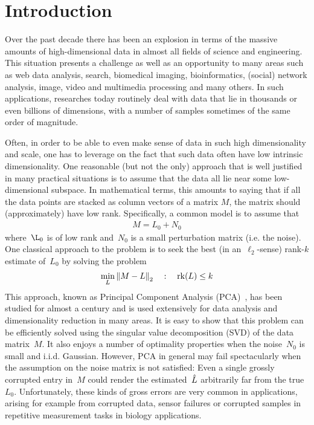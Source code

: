 \section*{Introduction}

Over the past decade there has been an explosion in terms of the massive amounts of high-dimensional data in almost all fields of science and engineering. This situation presents a challenge as well as an opportunity to many areas such as web data analysis, search, biomedical imaging, bioinformatics, (social) network analysis, image, video and multimedia processing and many others. In such applications, researches today routinely deal with data that lie in thousands or even billions of dimensions, with a number of samples sometimes of the same order of magnitude.

Often, in order to be able to even make sense of data in such high dimensionality and scale, one has to leverage on the fact that such data often have low intrinsic dimensionality. One reasonable (but not the only) approach that is well justified in many practical situations is to assume that the data all lie near some low-dimensional subspace. In mathematical terms, this amounts to saying that if all the data points are stacked as column vectors of a matrix $M$, the matrix should (approximately) have low rank. Specifically, a common model is to assume that 
%
\begin{align}
M=L_0+N_0
\label{IntroMot:lowrankness}
\end{align}
%
where~$\L_0$ is of low rank and~$N_0$ is a small perturbation matrix (i.e. the noise). One classical approach to the problem is to seek the best (in an~$\ell_2$-sense) rank-$k$ estimate of~$L_0$ by solving the problem
%
\begin{align}
\min_L {\left\|M-L\right\|}_{2}^{} \quad:\quad \operatorname{rk}(L)\leq k
\label{IntroMot:ClassicPCA}
\end{align}
%
This approach, known as Principal Component Analysis (PCA)~\cite{Eckart:1936uq,Hotelling:1933fk}, has been studied for almost a century and is used extensively for data analysis and dimensionality reduction in many areas. It is easy to show that this problem can be efficiently solved using the singular value decomposition (SVD) of the data matrix~$M$. It also enjoys a number of optimality properties when the noise~$N_0$ is small and i.i.d. Gaussian. However, PCA in general may fail spectacularly when the assumption on the noise matrix is not satisfied: Even a single grossly corrupted entry in~$M$ could render the estimated~${\hat{L}}$ arbitrarily far from the true~$L_0$. Unfortunately, these kinds of gross errors are very common in applications, arising for example from corrupted data, sensor failures or corrupted samples in repetitive measurement tasks in biology applications. 


